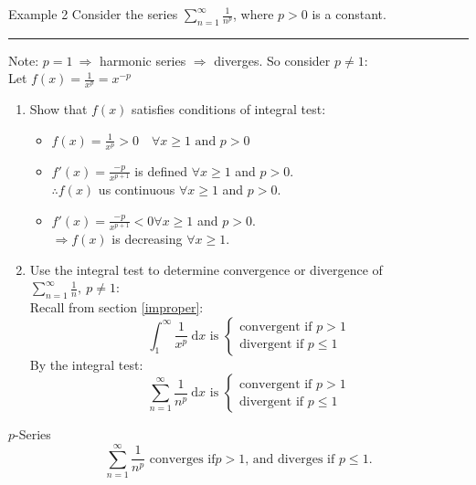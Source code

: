 \documentclass[12pt,a4paper]{article}
\def\d{{\mathrm{d}}}
\def\dx{\d x}
\begin{document}
\begin{eg}{Example 2}
	Consider the series $\displaystyle\sum_{n=1}^\infty\frac{1}{n^p}$, where $p>0$ is a constant. \\
	\noindent\rule[0.25\baselineskip]{\textwidth}{1pt}
	Note: $p=1\ \Rightarrow$ harmonic series $\Rightarrow$ diverges. So consider $p\neq1$: \\
	Let $\displaystyle f(x)=\frac{1}{x^p}=x^{-p}$
	\begin{enumerate}
		\item Show that $f(x)$ satisfies conditions of integral test: 
		\begin{itemize}
			\item $\displaystyle f(x)=\frac{1}{x^p}>0\quad\forall x\geq1\text{ and }p>0$
			\item $\displaystyle f'(x)=\frac{-p}{x^{p+1}}$ is defined $\forall x\geq1$ and $p>0$.\\
			$\therefore f(x)$ us continuous $\forall x\geq1$ and $p>0$.
			\item $f'(x)=\frac{-p}{x^{p+1}}<0 \forall x\geq1$ and $p>0$.\\
			$\Rightarrow f(x)$ is decreasing $\forall x\geq1$.
		\end{itemize}
		\item Use the integral test to determine convergence or divergence of $\displaystyle\sum_{n=1}^\infty\frac{1}{n},\ p\neq1$: \\
		Recall from section \ref{improper}: 
		$$\int_1^\infty\frac{1}{x^p}\ \dx\text{ is }\begin{cases}\text{convergent if }p>1\\\text{divergent if }p\leq1\end{cases}$$
		By the integral test: 
		$$\sum_{n=1}^\infty\frac{1}{n^p}\ \dx\text{ is }\begin{cases}\text{convergent if }p>1\\\text{divergent if }p\leq1\end{cases}$$
	\end{enumerate}
\end{eg}
\begin{rmk}{$p$-Series}
	$$\sum_{n=1}^\infty\frac{1}{n^p}\text{ converges if} p>1\text{, and diverges if }p\leq1.$$
\end{rmk}
\end{document}
